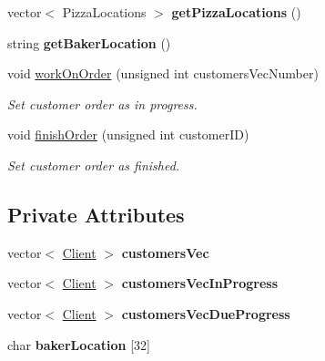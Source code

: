 \begin{CompactItemize}
\item 
\hypertarget{class_baker_3d38e7498fba59674c7d3838bf4c1824}{
vector$<$ Pizza\-Locations $>$ {\bf get\-Pizza\-Locations} ()}
\label{class_baker_3d38e7498fba59674c7d3838bf4c1824}

\item 
\hypertarget{class_baker_363b0d0c242923ca3a76ebd4e608cc2d}{
string {\bf get\-Baker\-Location} ()}
\label{class_baker_363b0d0c242923ca3a76ebd4e608cc2d}

\item 
void \hyperlink{class_baker_9616413c80f3814907a9c2399ac50438}{work\-On\-Order} (unsigned int customers\-Vec\-Number)
\begin{CompactList}\small\item\em Set customer order as in progress. \item\end{CompactList}\item 
void \hyperlink{class_baker_222a16bf113b70cbe0388a7291978a57}{finish\-Order} (unsigned int customer\-ID)
\begin{CompactList}\small\item\em Set customer order as finished. \item\end{CompactList}\end{CompactItemize}
\subsection*{Private Attributes}
\begin{CompactItemize}
\item 
\hypertarget{class_baker_52cc86469dd41b9be5b7186d6bd00589}{
vector$<$ \hyperlink{class_client}{Client} $>$ {\bf customers\-Vec}}
\label{class_baker_52cc86469dd41b9be5b7186d6bd00589}

\item 
\hypertarget{class_baker_0b7dacb9817ff529ee046a5c369051fa}{
vector$<$ \hyperlink{class_client}{Client} $>$ {\bf customers\-Vec\-In\-Progress}}
\label{class_baker_0b7dacb9817ff529ee046a5c369051fa}

\item 
\hypertarget{class_baker_e9843b8d2c12d0911de538ebe51c1b0d}{
vector$<$ \hyperlink{class_client}{Client} $>$ {\bf customers\-Vec\-Due\-Progress}}
\label{class_baker_e9843b8d2c12d0911de538ebe51c1b0d}

\item 
\hypertarget{class_baker_c8a23bee3af95af3a6fa8e3f631e9a92}{
char {\bf baker\-Location} \mbox{[}32\mbox{]}}
\label{class_baker_c8a23bee3af95af3a6fa8e3f631e9a92}

\end{CompactItemize}


